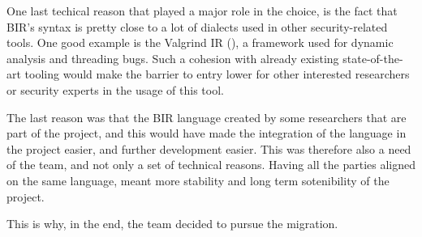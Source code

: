 One last techical reason that played a major role in the choice, is the fact that
BIR's syntax is pretty close to a lot of dialects used in other security-related
tools. One good example is the Valgrind IR (\cite{valgrind}), a framework used for
dynamic analysis and threading bugs. Such a cohesion with already existing state-of-the-art
tooling would make the barrier to entry lower for other interested researchers
or security experts in the usage of this tool.

The last reason was that the BIR language created by some researchers that are
part of the project, and this would have made the integration of the language in
the project easier, and further development easier. This was therefore also a need
of the team, and not only a set of technical reasons. Having all the parties aligned
on the same language, meant more stability and long term sotenibility of the
project.

This is why, in the end, the team decided to pursue the migration.